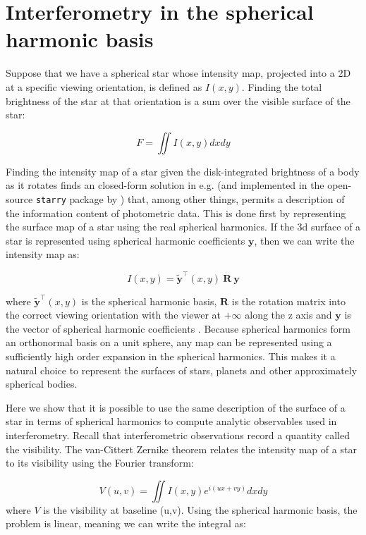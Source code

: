 \documentclass[modern]{aastex631}
\begin{document}
\section{Interferometry in the spherical harmonic basis}
\label{sec:maps}

Suppose that we have a spherical star whose intensity map, projected into a 2D at a specific viewing orientation, is defined as $I(x,y)$. Finding the total brightness of the star at that orientation is a sum over the visible surface of the star: 

\begin{equation}
F = \iint I(x,y) dx dy
\end{equation}
 
Finding the intensity map of a star given the disk-integrated brightness of a body as it rotates finds an closed-form solution in e.g. \citep{cowan2013} (and implemented in the open-source \texttt{starry} package by \citep{starry2019}) that, among other things, permits a description of the information content of photometric data. This is done first by representing the surface map of a star using the real spherical harmonics. If the 3d surface of a star is represented using spherical harmonic coefficients $\mathbf{y}$, then we can write the intensity map as:
 
\begin{equation}
    I(x,y) = \mathbf{\tilde{y}}^\top(x,y) \ \mathbf{R} \ \mathbf{y}
\end{equation}

where $\mathbf{\tilde{y}}^\top(x,y)$ is the spherical harmonic basis, $\mathbf{R}$ is the rotation matrix into the correct viewing orientation with the viewer at $+\infty$ along the z axis and $\mathbf{y}$ is the vector of spherical harmonic coefficients \citep{starry2019}. Because spherical harmonics form an orthonormal basis on a unit sphere, any map can be represented using a sufficiently high order expansion in the spherical harmonics. This makes it a natural choice to represent the surfaces of stars, planets and other approximately spherical bodies.

Here we show that it is possible to use the same description of the surface of a star in terms of spherical harmonics to compute analytic observables used in interferometry. Recall that interferometric observations record a quantity called the visibility. The van-Cittert Zernike theorem relates the intensity map of a star to its visibility using the Fourier transform:

\begin{equation}
V(u,v) = \iint I(x,y) e^{i(ux + vy)} dxdy
\end{equation}
where $V$ is the visibility at baseline (u,v). Using the spherical harmonic basis, the problem is linear, meaning we can write the integral as:
\end{document}
